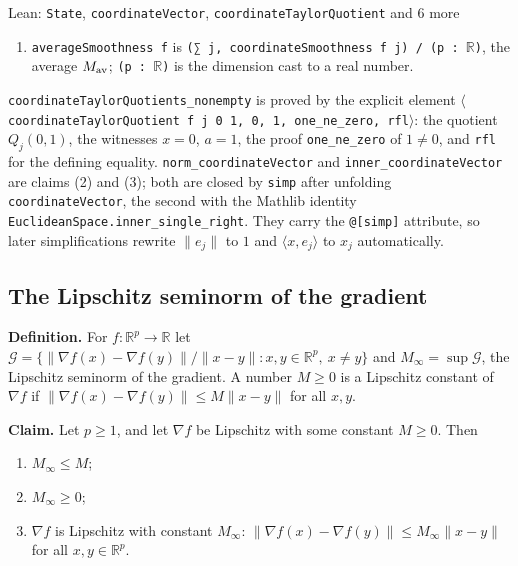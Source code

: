 \documentclass[11pt,a4paper]{report}
\begin{document}
\begin{leanbox}{Lean: \texttt{State}, \texttt{coordinateVector}, \texttt{coordinateTaylorQuotient} and 6 more}
\begin{enumerate}
\item \texttt{average\allowbreak{}Smoothness f} is \texttt{(∑ j, coordinate\allowbreak{}Smoothness f j) /\allowbreak{} (p : \ensuremath{\mathbb R})}, the average \(M_{\rm av}\); \texttt{(p : \ensuremath{\mathbb R})} is the dimension cast to a real number.

\end{enumerate}



\texttt{coordinate\allowbreak{}Taylor\allowbreak{}Quotients\_\allowbreak{}nonempty} is proved by the explicit element \texttt{\ensuremath{\langle}coordinate\allowbreak{}Taylor\allowbreak{}Quotient f j 0 1, 0, 1, one\_\allowbreak{}ne\_\allowbreak{}zero, rfl\ensuremath{\rangle}}: the quotient \(Q_j(0,1)\), the witnesses \(x=0\), \(a=1\), the proof \texttt{one\_\allowbreak{}ne\_\allowbreak{}zero} of \(1\ne0\), and \texttt{rfl} for the defining equality. \texttt{norm\_\allowbreak{}coordinate\allowbreak{}Vector} and \texttt{inner\_\allowbreak{}coordinate\allowbreak{}Vector} are claims (2) and (3); both are closed by \texttt{simp} after unfolding \texttt{coordinate\allowbreak{}Vector}, the second with the Mathlib identity \texttt{Euclidean\allowbreak{}Space.\allowbreak{}inner\_\allowbreak{}single\_\allowbreak{}right}. They carry the \texttt{@[simp]} attribute, so later simplifications rewrite \(\|e_j\|\) to \(1\) and \(\langle x,e_j\rangle\) to \(x_j\) automatically.
\end{leanbox}
\subsection{\texorpdfstring{The Lipschitz seminorm of the gradient}{The Lipschitz seminorm of the gradient}}
\label{report-step-AverageLMC-Assumptions-lean-2}


\textbf{Definition.} For \(f:\mathbb R^p\to\mathbb R\) let \(\mathcal G=\bigl\{\|\nabla f(x)-\nabla f(y)\|/\|x-y\|:x,y\in\mathbb R^p,\ x\ne y\bigr\}\) and \(M_\infty=\sup\mathcal G\), the Lipschitz seminorm of the gradient. A number \(M\ge0\) is a Lipschitz constant of \(\nabla f\) if \(\|\nabla f(x)-\nabla f(y)\|\le M\|x-y\|\) for all \(x,y\).




\textbf{Claim.} Let \(p\ge1\), and let \(\nabla f\) be Lipschitz with some constant \(M\ge0\). Then



\begin{enumerate}


\item \(M_\infty\le M\);

\item \(M_\infty\ge0\);

\item \(\nabla f\) is Lipschitz with constant \(M_\infty\): \(\|\nabla f(x)-\nabla f(y)\|\le M_\infty\|x-y\|\) for all \(x,y\in\mathbb R^p\).

\end{enumerate}
\end{document}
